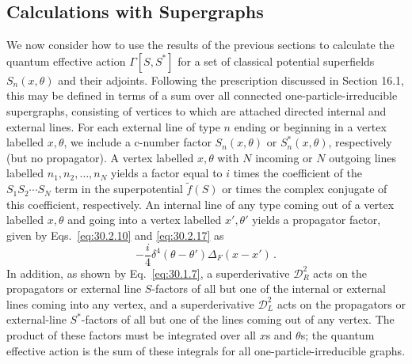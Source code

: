 
\providecommand{\SuperD}{\mathcal{D}}

\subsection{Calculations with Supergraphs}

We now consider how to use the results of the previous sections to calculate
the quantum effective action \(\Gamma[S,S^*]\) for a set of classical
potential superfields \(S_n(x,\theta)\) and their adjoints. Following the
prescription discussed in Section 16.1, this may be defined in terms of a sum
over all connected one-particle-irreducible supergraphs, consisting of
vertices to which are attached directed internal and external lines. For each
external line of type \(n\) ending or beginning in a vertex labelled
\(x,\theta\), we include a c-number factor \(S_n(x,\theta)\) or
\(S_n^*(x,\theta)\), respectively (but no propagator). A vertex labelled
\(x,\theta\) with \(N\) incoming or \(N\) outgoing lines labelled
\(n_1,n_2,\ldots,n_N\) yields a factor equal to \(i\) times the coefficient
of the \(S_1S_2\cdots S_N\) term in the superpotential \(\widetilde f(S)\) or
times the complex conjugate of this coefficient, respectively. An internal
line of any type coming out of a vertex labelled \(x,\theta\) and going into a
vertex labelled \(x',\theta'\) yields a propagator factor, given by
Eqs.~\eqref{eq:30.2.10} and \eqref{eq:30.2.17} as
\begin{equation}
  -\frac{i}{4}\delta^4(\theta-\theta')\Delta_F(x-x')\,.
  \tag{30.3.1}\label{eq:30.3.1}
\end{equation}
In addition, as shown by Eq.~\eqref{eq:30.1.7}, a superderivative
\(\SuperD_R^2\) acts on the propagators or external line \(S\)-factors of all
but one of the internal or external lines coming into any vertex, and a
superderivative \(\SuperD_L^2\) acts on the propagators or external-line
\(S^*\)-factors of all but one of the lines coming out of any vertex. The
product of these factors must be integrated over all \(x\)s and \(\theta\)s;
the quantum effective action is the sum of these integrals for all
one-particle-irreducible graphs.

